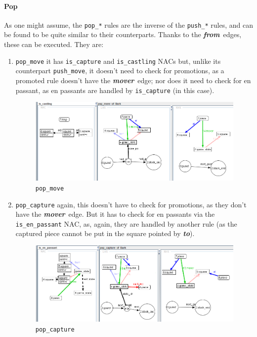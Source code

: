 \documentclass[a4paper, 10pt]{scrartcl}
\newcommand{\edgerepr}[1]{\textit{\textbf{#1}}}
\newcommand{\mover}{\edgerepr{mover}}
\newcommand{\tosquare}{\edgerepr{to}}
\newcommand{\fromsquare}{\edgerepr{from}}
\begin{document}
    \paragraph*{Pop} As one might assume, the \texttt{pop\_*} rules are the inverse of the \texttt{push\_*} rules, and can be found to be quite similar to their counterparts. Thanks to the \fromsquare\ edges, these can be executed. They are:
    \begin{enumerate}
        \item \texttt{pop\_move} it has \texttt{is\_capture} and \texttt{is\_castling} NACs but, unlike its counterpart \texttt{push\_move}, it doesn't need to check for promotions, as a promoted rule doesn't have the \mover\ edge; nor does it need to check for en passant, as en passants are handled by \texttt{is\_capture} (in this case).
        \begin{figure}[H]
            \centering
            \includegraphics[width=.8\linewidth]{images/pop_move.png}
            \caption{\texttt{pop\_move}}
        \end{figure}
        \item \texttt{pop\_capture} again, this doesn't have to check for promotions, as they don't have the \mover\ edge. But it has to check for en passants via the \texttt{is\_en\_passant} NAC, as, again, they are handled by another rule (as the captured piece cannot be put in the square pointed by \tosquare).
        \begin{figure}[H]
            \centering
            \includegraphics[width=.8\linewidth]{images/pop_capture.png}
            \caption{\texttt{pop\_capture}}
        \end{figure}

\end{enumerate}
\end{document}
